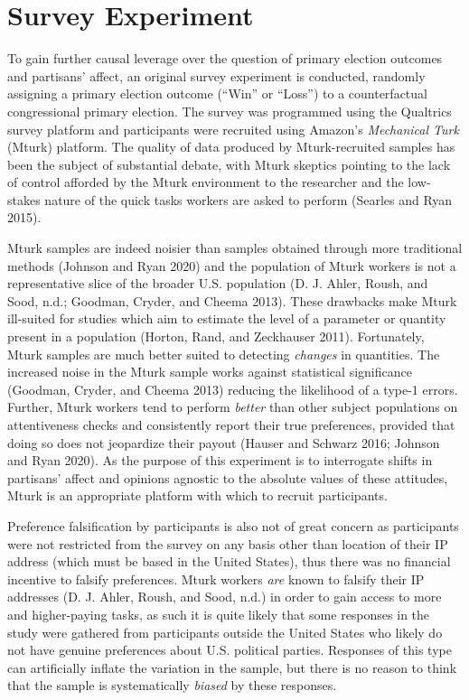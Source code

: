 \documentclass[
]{article}
\begin{document}
\hypertarget{survey-experiment}{%
\section{Survey Experiment}\label{survey-experiment}}

To gain further causal leverage over the question of primary election outcomes and partisans' affect, an original survey experiment is conducted, randomly assigning a primary election outcome (``Win'' or ``Loss'') to a counterfactual congressional primary election. The survey was programmed using the Qualtrics survey platform and participants were recruited using Amazon's \emph{Mechanical Turk} (Mturk) platform. The quality of data produced by Mturk-recruited samples has been the subject of substantial debate, with Mturk skeptics pointing to the lack of control afforded by the Mturk environment to the researcher and the low-stakes nature of the quick tasks workers are asked to perform (Searles and Ryan 2015).

Mturk samples are indeed noisier than samples obtained through more traditional methods (Johnson and Ryan 2020) and the population of Mturk workers is not a representative slice of the broader U.S. population (D. J. Ahler, Roush, and Sood, n.d.; Goodman, Cryder, and Cheema 2013). These drawbacks make Mturk ill-suited for studies which aim to estimate the level of a parameter or quantity present in a population (Horton, Rand, and Zeckhauser 2011). Fortunately, Mturk samples are much better suited to detecting \emph{changes} in quantities. The increased noise in the Mturk sample works against statistical significance (Goodman, Cryder, and Cheema 2013) reducing the likelihood of a type-1 errors. Further, Mturk workers tend to perform \emph{better} than other subject populations on attentiveness checks and consistently report their true preferences, provided that doing so does not jeopardize their payout (Hauser and Schwarz 2016; Johnson and Ryan 2020). As the purpose of this experiment is to interrogate shifts in partisans' affect and opinions agnostic to the absolute values of these attitudes, Mturk is an appropriate platform with which to recruit participants.

Preference falsification by participants is also not of great concern as participants were not restricted from the survey on any basis other than location of their IP address (which must be based in the United States), thus there was no financial incentive to falsify preferences. Mturk workers \emph{are} known to falsify their IP addresses (D. J. Ahler, Roush, and Sood, n.d.) in order to gain access to more and higher-paying tasks, as such it is quite likely that some responses in the study were gathered from participants outside the United States who likely do not have genuine preferences about U.S. political parties. Responses of this type can artificially inflate the variation in the sample, but there is no reason to think that the sample is systematically \emph{biased} by these responses.
\end{document}
